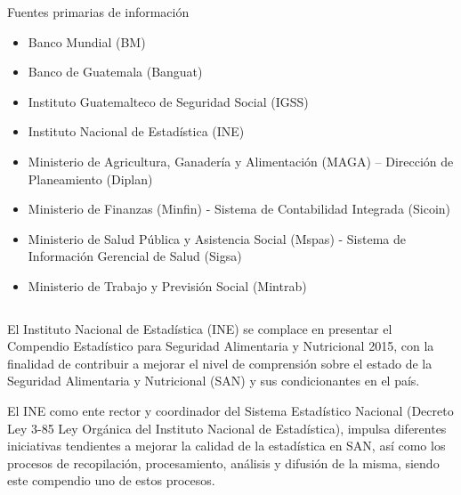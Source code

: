 \begin{center}
	{\Bold \LARGE Fuentes primarias de información}\\[2cm]
	
	\begin{itemize}
			\item Banco Mundial (BM)
			\item 	Banco de Guatemala (Banguat)
			\item 	Instituto Guatemalteco de Seguridad Social (IGSS)
			\item 	Instituto Nacional de Estadística (INE)
			\item 	Ministerio de Agricultura, Ganadería y Alimentación (MAGA) – Dirección de Planeamiento (Diplan)
			\item 	Ministerio de Finanzas (Minfin) - Sistema de Contabilidad Integrada (Sicoin)
			\item 	Ministerio de Salud Pública y Asistencia Social (Mspas) - Sistema de Información Gerencial de Salud (Sigsa)
			\item 	Ministerio de Trabajo y Previsión Social (Mintrab)
			
	\end{itemize}	
	
\end{center}\cleardoublepage




\cleardoublepage
\pagestyle{estandar}
\setlength{\arrayrulewidth}{1.0pt}





\cleardoublepage


$\ $\\[2cm]
\indent{}




$\ $\\[0.5cm]
\large
\indent El Instituto Nacional de Estadística 	(INE) se complace en presentar el Compendio Estadístico para Seguridad Alimentaria y Nutricional 2015, con la finalidad de contribuir a mejorar el nivel de comprensión sobre el estado de la Seguridad Alimentaria y Nutricional (SAN) y sus condicionantes en el país.

El INE como ente rector y coordinador del Sistema Estadístico Nacional (Decreto Ley 3-85 Ley Orgánica del Instituto Nacional de Estadística), impulsa diferentes iniciativas tendientes a mejorar la calidad de la estadística en SAN, así como los procesos de recopilación, procesamiento, análisis y difusión de la misma, siendo este compendio uno de estos procesos.


